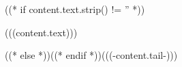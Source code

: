((* if content.text.strip() != '' *))\begin{bfseries}(((content.text))) \end{bfseries}((* else *))((* endif *))(((-content.tail-)))